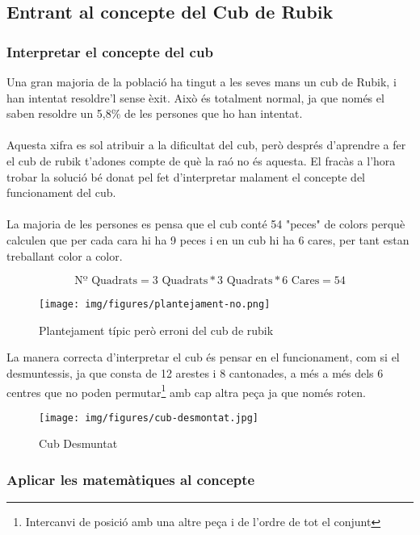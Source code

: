 \subsection{Entrant al concepte del Cub de Rubik}

\subsubsection{Interpretar el concepte del cub}

Una gran majoria de la població ha tingut a les seves mans un cub de Rubik, i han intentat resoldre'l sense èxit. Això és totalment normal, ja que només el saben resoldre un 5,8\% de les persones que ho han intentat\cite{redbull-cub}.
\\\\Aquesta xifra es sol atribuir a la dificultat del cub, però després d'aprendre a fer el cub de rubik t'adones compte de què la raó no és aquesta. El fracàs a l'hora trobar la solució bé donat pel fet d'interpretar malament el concepte del funcionament del cub.
\\\\La majoria de les persones es pensa que el cub conté 54 "peces" de colors perquè calculen que per cada cara hi ha 9 peces i en un cub hi ha 6 cares, per tant estan treballant color a color.

$$ \textrm{Nº Quadrats} = 3\textrm{ Quadrats}*3\textrm{ Quadrats}*6\textrm{ Cares} = 54 $$

\begin{figure}[ht]
    \centering
    \texttt{[image: img/figures/plantejament-no.png]}
    \caption{Plantejament típic però erroni del cub de rubik}
    \label{fig:plantejament-no}
\end{figure}

La manera correcta d'interpretar el cub és pensar en el funcionament, com si el desmuntessis, ja que consta de 12 arestes i 8 cantonades, a més a més dels 6 centres que no poden permutar\footnote{Intercanvi de posició amb una altre peça i de l'ordre de tot el conjunt} amb cap altra peça ja que només roten.

\begin{figure}[ht]
    \centering
    \texttt{[image: img/figures/cub-desmontat.jpg]}
    \caption{Cub Desmuntat}
    \label{fig:cub-desmuntat}
\end{figure}

\subsubsection{Aplicar les matemàtiques al concepte}

